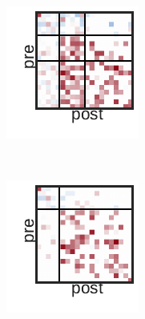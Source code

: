 \begin{figure}[t!]
\begin{subfigure}[b]{1.10in}
  \end{subfigure}
  ~
  \hspace{-.1in}
  \begin{subfigure}[b]{1.10in}
    \centering
    \includegraphics[width=\textwidth]{figures/ch3/SBM-SBM.pdf}
  \end{subfigure}
  ~
  \hspace{-.1in}
  \begin{subfigure}[b]{1.10in}
    \centering
    \includegraphics[width=\textwidth]{figures/ch3/Distance-SBM.pdf}

\end{subfigure}
\end{figure}
